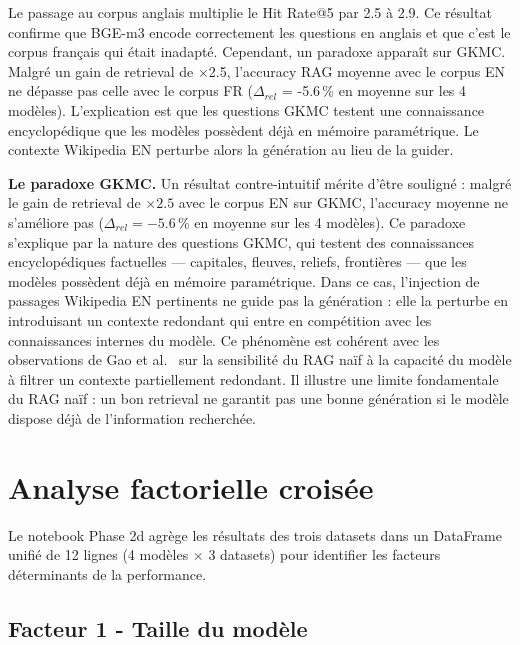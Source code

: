 \documentclass[12pt,a4paper]{article}
\begin{document}
Le passage au corpus anglais multiplie le Hit Rate@5 par 2.5 \`a 2.9. Ce r\'esultat confirme que BGE-m3 encode correctement les questions en anglais et que c'est le corpus fran\c{c}ais qui \'etait inadapt\'e. Cependant, un paradoxe appara\^it sur GKMC. Malgr\'e un gain de retrieval de $\times$2.5, l'accuracy RAG moyenne avec le corpus EN ne d\'epasse pas celle avec le corpus FR ($\Delta_{rel}$ = -5.6\,\% en moyenne sur les 4 mod\`eles). L'explication est que les questions GKMC testent une connaissance encyclop\'edique que les mod\`eles poss\`edent d\'ej\`a en m\'emoire param\'etrique. Le contexte Wikipedia EN perturbe alors la g\'en\'eration au lieu de la guider.

\medskip

\noindent\textbf{Le paradoxe GKMC.}
Un résultat contre-intuitif mérite d'être souligné : malgré le gain de retrieval de 
$\times 2.5$ avec le corpus EN sur GKMC, l'accuracy moyenne ne s'améliore pas 
($\Delta_{rel} = -5.6$\,\% en moyenne sur les 4 modèles). Ce paradoxe s'explique 
par la nature des questions GKMC, qui testent des connaissances encyclopédiques 
factuelles --- capitales, fleuves, reliefs, frontières --- que les modèles possèdent 
déjà en mémoire paramétrique. Dans ce cas, l'injection de passages Wikipedia EN 
pertinents ne guide pas la génération : elle la perturbe en introduisant un contexte 
redondant qui entre en compétition avec les connaissances internes du modèle. Ce 
phénomène est cohérent avec les observations de Gao et al.~\cite{gao2023ragsurvey} sur la sensibilité 
du RAG naïf à la capacité du modèle à filtrer un contexte partiellement redondant. 
Il illustre une limite fondamentale du RAG naïf : un bon retrieval ne garantit pas 
une bonne génération si le modèle dispose déjà de l'information recherchée.


\section{Analyse factorielle crois\'ee}
\label{sec:analyse}

Le notebook Phase 2d agr\`ege les r\'esultats des trois datasets dans un DataFrame unifi\'e de 12 lignes (4 mod\`eles $\times$ 3 datasets) pour identifier les facteurs d\'eterminants de la performance.

\subsection{Facteur 1 - Taille du mod\`ele}
\end{document}
